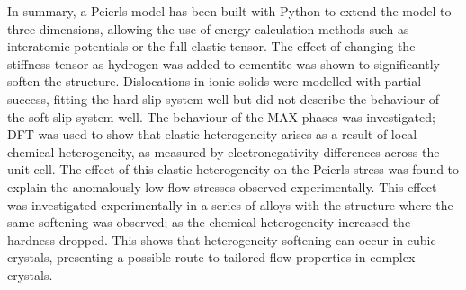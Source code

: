 In summary, a Peierls model has been built with Python to extend the model to three dimensions, allowing the use of energy calculation methods such as interatomic potentials or the full elastic tensor. The effect of changing the stiffness tensor as hydrogen was added to cementite was shown to significantly soften the structure. Dislocations in ionic solids were modelled with partial success, fitting the hard slip system well but did not describe the behaviour of the soft slip system well. The behaviour of the MAX phases was investigated; DFT was used to show that elastic heterogeneity arises as a result of local chemical heterogeneity, as measured by electronegativity differences across the unit cell. The effect of this elastic heterogeneity on the Peierls stress was found to explain the anomalously low flow stresses observed experimentally. This effect was investigated experimentally in a series of alloys with the  structure where the same softening was observed; as the chemical heterogeneity increased the hardness dropped. This shows that heterogeneity softening can occur in cubic crystals, presenting a possible route to tailored flow properties in complex crystals.


































































